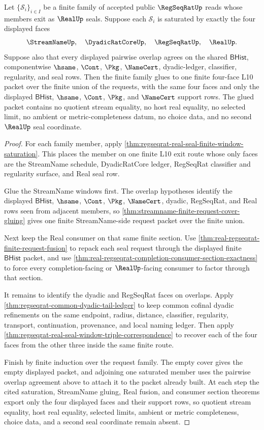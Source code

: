 \begin{theorem}
\label{thm:regseqrat-real-seal-finite-cover-gluing}
Let $\{\mathcal{S}_i\}_{i\in I}$ be a finite family of accepted public
$\RegSeqRatUp$ reads whose members exit as $\RealUp$ seals. Suppose each
$\mathcal{S}_i$ is saturated by exactly the four displayed faces
$$
\StreamNameUp,\quad \DyadicRatCoreUp,\quad \RegSeqRatUp,\quad \RealUp.
$$
Suppose also that every displayed pairwise overlap agrees on the shared
$\mathsf{BHist}$, componentwise $\hsame$, $\Cont$, $\Pkg$, $\NameCert$,
dyadic-ledger, classifier, regularity, and seal rows. Then the finite family
glues to one finite four-face L10 packet over the finite union of the
requests, with the same four faces and only the displayed
$\mathsf{BHist}$, $\hsame$, $\Cont$, $\Pkg$, and $\NameCert$ support rows.
The glued packet contains no quotient stream equality, no host real equality,
no selected limit, no ambient or metric-completeness datum, no choice data,
and no second $\RealUp$ seal coordinate.
\end{theorem}
\begin{proof}
For each family member, apply
\autoref{thm:regseqrat-real-seal-finite-window-saturation}. This places the
member on one finite L10 exit route whose only faces are the StreamName
schedule, DyadicRatCore ledger, RegSeqRat classifier and regularity surface,
and Real seal row.

Glue the StreamName windows first. The overlap hypotheses identify the
displayed $\mathsf{BHist}$, $\hsame$, $\Cont$, $\Pkg$, $\NameCert$, dyadic,
RegSeqRat, and Real rows seen from adjacent members, so
\autoref{thm:streamname-finite-request-cover-gluing} gives one finite
StreamName-side request packet over the finite union.

Next keep the Real consumer on that same finite section. Use
\autoref{thm:real-regseqrat-finite-request-fusion} to repack each seal request
through the displayed finite $\mathsf{BHist}$ packet, and use
\autoref{thm:real-regseqrat-completion-consumer-section-exactness} to force
every completion-facing or $\RealUp$-facing consumer to factor through that
section.

It remains to identify the dyadic and RegSeqRat faces on overlaps. Apply
\autoref{thm:regseqrat-common-dyadic-tail-ledger} to keep common cofinal
dyadic refinements on the same endpoint, radius, distance, classifier,
regularity, transport, continuation, provenance, and local naming ledger.
Then apply
\autoref{thm:regseqrat-real-seal-window-triple-correspondence} to recover each
of the four faces from the other three inside the same finite route.

Finish by finite induction over the request family. The empty cover gives the
empty displayed packet, and adjoining one saturated member uses the pairwise
overlap agreement above to attach it to the packet already built. At each
step the cited saturation, StreamName gluing, Real fusion, and consumer
section theorems export only the four displayed faces and their support rows,
so quotient stream equality, host real equality, selected limits, ambient or
metric completeness, choice data, and a second seal coordinate remain absent.
\end{proof}

